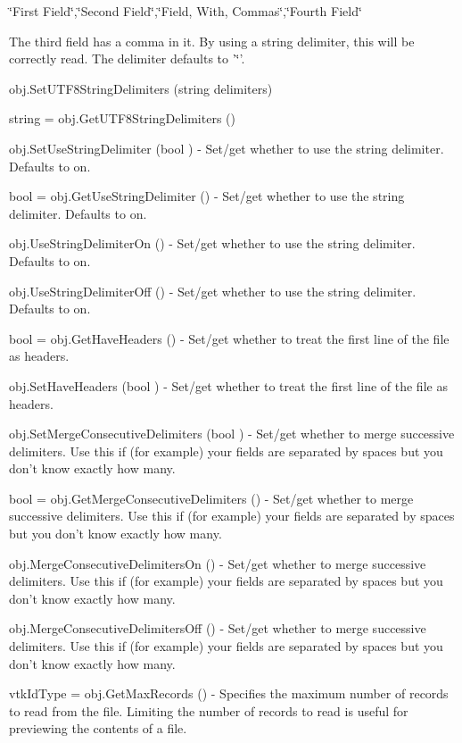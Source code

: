 \begin{DoxyItemize}
\char`\"{}\-First Field\char`\"{},\char`\"{}\-Second Field\char`\"{},\char`\"{}\-Field, With, Commas\char`\"{},\char`\"{}\-Fourth Field\char`\"{}

The third field has a comma in it. By using a string delimiter, this will be correctly read. The delimiter defaults to '\char`\"{}'.  
\item {\ttfamily obj.\-Set\-U\-T\-F8\-String\-Delimiters (string delimiters)}  
\item {\ttfamily string = obj.\-Get\-U\-T\-F8\-String\-Delimiters ()}  
\item {\ttfamily obj.\-Set\-Use\-String\-Delimiter (bool )} -\/ Set/get whether to use the string delimiter. Defaults to on.  
\item {\ttfamily bool = obj.\-Get\-Use\-String\-Delimiter ()} -\/ Set/get whether to use the string delimiter. Defaults to on.  
\item {\ttfamily obj.\-Use\-String\-Delimiter\-On ()} -\/ Set/get whether to use the string delimiter. Defaults to on.  
\item {\ttfamily obj.\-Use\-String\-Delimiter\-Off ()} -\/ Set/get whether to use the string delimiter. Defaults to on.  
\item {\ttfamily bool = obj.\-Get\-Have\-Headers ()} -\/ Set/get whether to treat the first line of the file as headers.  
\item {\ttfamily obj.\-Set\-Have\-Headers (bool )} -\/ Set/get whether to treat the first line of the file as headers.  
\item {\ttfamily obj.\-Set\-Merge\-Consecutive\-Delimiters (bool )} -\/ Set/get whether to merge successive delimiters. Use this if (for example) your fields are separated by spaces but you don't know exactly how many.  
\item {\ttfamily bool = obj.\-Get\-Merge\-Consecutive\-Delimiters ()} -\/ Set/get whether to merge successive delimiters. Use this if (for example) your fields are separated by spaces but you don't know exactly how many.  
\item {\ttfamily obj.\-Merge\-Consecutive\-Delimiters\-On ()} -\/ Set/get whether to merge successive delimiters. Use this if (for example) your fields are separated by spaces but you don't know exactly how many.  
\item {\ttfamily obj.\-Merge\-Consecutive\-Delimiters\-Off ()} -\/ Set/get whether to merge successive delimiters. Use this if (for example) your fields are separated by spaces but you don't know exactly how many.  
\item {\ttfamily vtk\-Id\-Type = obj.\-Get\-Max\-Records ()} -\/ Specifies the maximum number of records to read from the file. Limiting the number of records to read is useful for previewing the contents of a file.  

\end{DoxyItemize}
